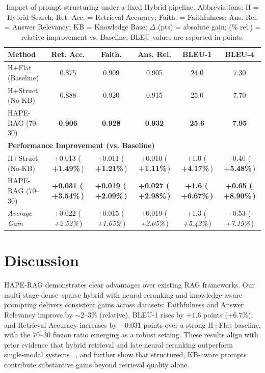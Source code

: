\documentclass[10pt,twocolumn,letterpaper]{article}
\begin{document}
\begin{table}[t]
\small
\centering
\caption{Impact of prompt structuring under a fixed Hybrid pipeline. Abbreviations: H = Hybrid Search; Ret. Acc. = Retrieval Accuracy; Faith. = Faithfulness; Ans. Rel. = Answer Relevancy; KB = Knowledge Base; $\Delta$ (pts) = absolute gain; (\% rel.) = relative improvement vs. Baseline. BLEU values are reported in points.}
\label{tab:prompt_ablation_perf_block_final}
\setlength{\tabcolsep}{3.8pt}
\renewcommand{\arraystretch}{1.14}
\begin{tabular}{l c c c c c}
\toprule
\textbf{Method} & \textbf{Ret. Acc.} & \textbf{Faith.} & \textbf{Ans. Rel.} & \textbf{BLEU-1} & \textbf{BLEU-4} \\
\midrule
H+Flat (Baseline)                  & 0.875 & 0.909 & 0.905 & 24.0 & 7.30 \\
H+Struct (No-KB)                   & 0.888 & 0.920 & 0.915 & 25.0 & 7.70 \\
HAPE-RAG (70--30)                  & \textbf{0.906} & \textbf{0.928} & \textbf{0.932} & \textbf{25.6} & \textbf{7.95} \\
\midrule
\multicolumn{6}{l}{\textbf{Performance Improvement (vs. Baseline)}} \\
\midrule
H+Struct (No-KB)
& +0.013 (\,\textbf{+1.49\%}\,)
& +0.011 (\,\textbf{+1.21\%}\,)
& +0.010 (\,\textbf{+1.11\%}\,)
& +1.0 (\,\textbf{+4.17\%}\,)
& +0.40 (\,\textbf{+5.48\%}\,) \\
HAPE-RAG (70--30)
& \textbf{+0.031 (\,\textbf{+3.54\%}\,)}
& \textbf{+0.019 (\,\textbf{+2.09\%}\,)}
& \textbf{+0.027 (\,\textbf{+2.98\%}\,)}
& \textbf{+1.6 (\,\textbf{+6.67\%}\,)}
& \textbf{+0.65 (\,\textbf{+8.90\%}\,)} \\
\midrule
\textit{Average Gain}
& +0.022 (\,\textit{+2.52\%}\,)
& +0.015 (\,\textit{+1.65\%}\,)
& +0.019 (\,\textit{+2.05\%}\,)
& +1.3 (\,\textit{+5.42\%}\,)
& +0.53 (\,\textit{+7.19\%}\,) \\
\bottomrule
\end{tabular}
\end{table}

\section{Discussion}

HAPE‑RAG demonstrates clear advantages over existing RAG frameworks. Our multi‑stage dense–sparse hybrid with neural reranking and knowledge‑aware prompting delivers consistent gains across datasets: Faithfulness and Answer Relevancy improve by $\sim$2–3\% (relative), BLEU‑1 rises by $+1.6$ points (+6.7\%), and Retrieval Accuracy increases by $+0.031$ points over a strong H+Flat baseline, with the 70--30 fusion ratio emerging as a robust setting. These results align with prior evidence that hybrid retrieval and late neural reranking outperform single‑modal systems ~\cite{gao2021retrieval,mao2023neural}, and further show that structured, KB‑aware prompts contribute substantive gains beyond retrieval quality alone.
\end{document}
